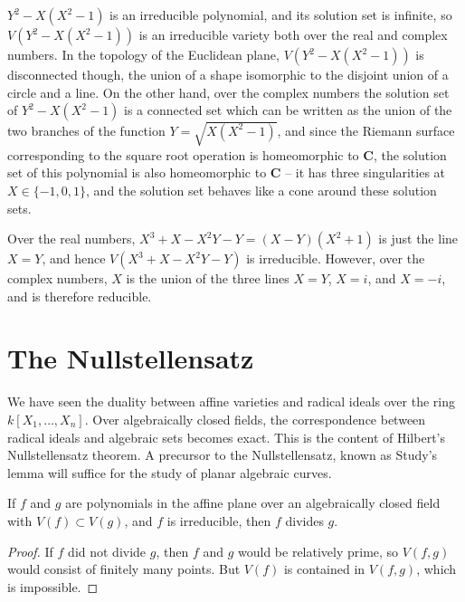 \begin{example}
    $Y^2 - X(X^2 - 1)$ is an irreducible polynomial, and its solution set is infinite, so $V(Y^2 - X(X^2 - 1))$ is an irreducible variety both over the real and complex numbers. In the topology of the Euclidean plane, $V(Y^2 - X(X^2 - 1))$ is disconnected though, the union of a shape isomorphic to the disjoint union of a circle and a line. On the other hand, over the complex numbers the solution set of $Y^2 - X(X^2 - 1)$ is a connected set which can be written as the union of the two branches of the function $Y = \sqrt{X(X^2 - 1)}$, and since the Riemann surface corresponding to the square root operation is homeomorphic to $\mathbf{C}$, the solution set of this polynomial is also homeomorphic to $\mathbf{C}$ -- it has three singularities at $X \in \{ -1, 0, 1 \}$, and the solution set behaves like a cone around these solution sets.
\end{example}

\begin{example}
    Over the real numbers, $X^3 + X - X^2Y - Y = (X-Y)(X^2 + 1)$ is just the line $X = Y$, and hence $V(X^3 + X - X^2Y - Y)$ is irreducible. However, over the complex numbers, $X$ is the union of the three lines $X = Y$, $X = i$, and $X = -i$, and is therefore reducible.
\end{example}

\section{The Nullstellensatz}

We have seen the duality between affine varieties and radical ideals over the ring $k[X_1, \dots, X_n]$. Over algebraically closed fields, the correspondence between radical ideals and algebraic sets becomes exact. This is the content of Hilbert's Nullstellensatz theorem. A precursor to the Nullstellensatz, known as Study's lemma will suffice for the study of planar algebraic curves.

\begin{theorem}[Study]
    If $f$ and $g$ are polynomials in the affine plane over an algebraically closed field with $V(f) \subset V(g)$, and $f$ is irreducible, then $f$ divides $g$.
\end{theorem}
\begin{proof}
    If $f$ did not divide $g$, then $f$ and $g$ would be relatively prime, so $V(f,g)$ would consist of finitely many points. But $V(f)$ is contained in $V(f,g)$, which is impossible.
\end{proof}

